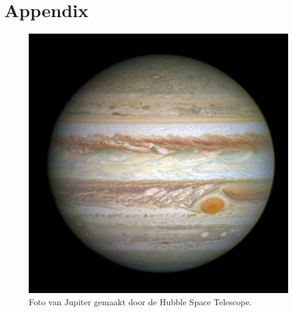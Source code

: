 \documentclass[a4paper]{article}
\begin{document}
\newpage
\section{Appendix}
	\begin{figure}[h]
		\centering
		\includegraphics[scale=0.24]{img/JupiterRedDot.jpg}
		\caption{Foto van Jupiter gemaakt door de Hubble Space Telescope.}
		\label{fig:JupiterRedDot}
	\end{figure}
\end{document}
